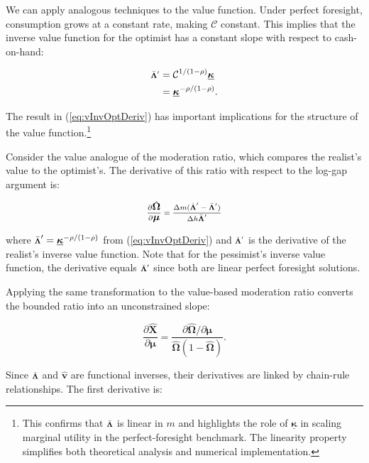 \documentclass[preprint,authoryear]{elsarticle}
\newcommand{\CRRA}{\rho}
\newcommand{\mNrm}{m}
\newcommand{\vFunc}{\mathbf{v}}
\newcommand{\vInv}{{\scriptsize \boldsymbol{\Lambda}}}
\newcommand{\vInvOpt}{\bar{\vInv}}
\newcommand{\vInvReal}{\hat{\vInv}}
\newcommand{\hNrm}{h}
\newcommand{\MPC}{\boldsymbol{\kappa}}
\newcommand{\MPCmin}{\underline{\MPC}}
\newcommand{\logmNrmEx}{\boldsymbol{\mu}}
\newcommand{\mNrmEx}{\Delta \mNrm}
\newcommand{\hNrmEx}{\Delta \hNrm}
\newcommand{\PDVCoverc}{\mathcal{C}}
\newcommand{\vFuncReal}{\hat{\vFunc}}
\newcommand{\valModRte}{\boldsymbol{\Omega}}
\newcommand{\valModRteReal}{\hat{\valModRte}}
\newcommand{\logitValModRteReal}{\hat{\boldsymbol{X}}}
\newcommand{\vInvOptDeriv}{\vInvOpt'}
\newcommand{\vInvRealDeriv}{\vInvReal'}
\begin{document}
We can apply analogous techniques to the value function. Under perfect foresight, consumption grows at a constant rate, making $\PDVCoverc$ constant. This implies that the inverse value function for the optimist has a constant slope with respect to cash-on-hand:

\begin{equation}
\label{eq:vInvOptDeriv}
\begin{aligned}
\vInvOptDeriv &= \PDVCoverc^{1/(1-\CRRA)} \MPCmin \\
&= \MPCmin^{-\CRRA/(1-\CRRA)}.
\end{aligned}
\end{equation}

The result in (\ref{eq:vInvOptDeriv}) has important implications for the structure of the value function.\footnote{This confirms that $\vInvOpt$ is linear in $\mNrm$ and highlights the role of $\MPCmin$ in scaling marginal utility in the perfect-foresight benchmark. The linearity property simplifies both theoretical analysis and numerical implementation.}

Consider the value analogue of the moderation ratio, which compares the realist's value to the optimist's. The derivative of this ratio with respect to the log-gap argument is:

\begin{equation}
\label{eq:valModRteRealDerivmu}
\frac{\partial \valModRteReal}{\partial \logmNrmEx} = \frac{\mNrmEx (\vInvRealDeriv - \vInvOptDeriv)}{\hNrmEx \vInvOptDeriv}
\end{equation}

where $\vInvOptDeriv = \MPCmin^{ -\CRRA/(1 -\CRRA)}$ from (\ref{eq:vInvOptDeriv}) and $\vInvRealDeriv$ is the derivative of the realist's inverse value function. Note that for the pessimist's inverse value function, the derivative equals $\vInvOptDeriv$ since both are linear perfect foresight solutions.

Applying the same transformation to the value-based moderation ratio converts the bounded ratio into an unconstrained slope:

\begin{equation}
\label{eq:logitValModRteRealDerivmu}
\frac{\partial \logitValModRteReal}{\partial \logmNrmEx} = \frac{\partial \valModRteReal / \partial \logmNrmEx}{\valModRteReal(1-\valModRteReal)}.
\end{equation}

Since $\vInvReal$ and $\vFuncReal$ are functional inverses, their derivatives are linked by chain-rule relationships. The first derivative is:
\end{document}
